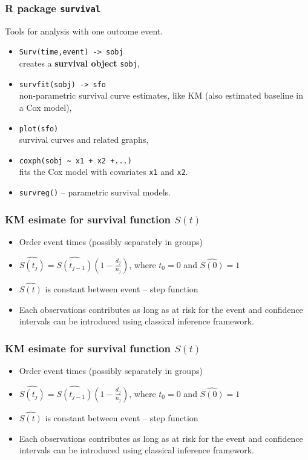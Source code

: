 \documentclass[12pt]{beamer}
\begin{document}
\begin{frame}[fragile]

\frametitle{R package \texttt{survival} }

Tools for analysis with one outcome event.

\begin{itemize}
\item 
\texttt{Surv(time,event) -> sobj} \\ 
creates a \textbf{survival object} \texttt{sobj}, %
\item 
\texttt{survfit(sobj) -> sfo} \\
 non-parametric survival curve estimates, like KM 
(also estimated baseline in a Cox model), 
\item 
\texttt{plot(sfo)} \\
 survival curves and related graphs, 
\item 
\verb|coxph(sobj ~ x1 + x2 +...)| \\ 
fits the Cox model
with covariates \texttt{x1} and \texttt{x2}. 
\item 
\texttt{survreg()} -- parametric survival models.
\end{itemize}   
\end{frame}

\begin{frame}
\frametitle{KM esimate for survival function $S(t)$}

\begin{itemize}
\item  Order event times (possibly separately in groups)
\item $\hat{S(t_j)}=\hat{S(t_{j-1})} (1-\frac{d_j}{n_j}) $, where $t_0=0$ and
${\hat{S(0)}=1}$
\item ${\hat{S(t)}}$ is constant between event -- step function 
\item Each observations contributes as long as at risk for the event and confidence intervals can be introduced using classical inference framework.

\end{itemize}   
\end{frame}

\begin{frame}
\frametitle{KM esimate for survival function $S(t)$}

\begin{itemize}
\item  Order event times (possibly separately in groups)
\item $\hat{S(t_j)}=\hat{S(t_{j-1})} (1-\frac{d_j}{n_j}) $, where $t_0=0$ and
${\hat{S(0)}=1}$
\item ${\hat{S(t)}}$ is constant between event -- step function 
\item Each observations contributes as long as at risk for the event and confidence intervals can be introduced using classical inference framework.

\end{itemize}   
\end{frame}
\end{document}
